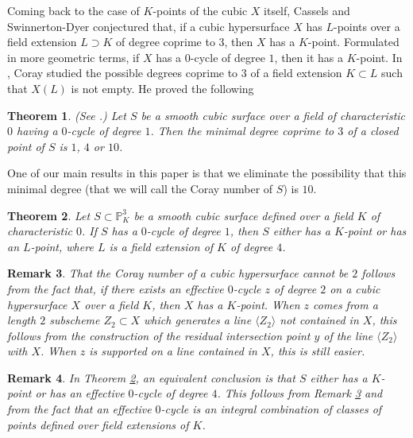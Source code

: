 \documentclass[10pt]{article}
\newtheorem{theo}{Theorem}[section]
\newtheorem{rema}[theo]{Remark}
\begin{document}
Coming back to the case of $K$-points of the cubic $X$ itself, Cassels and Swinnerton-Dyer conjectured that, if a cubic hypersurface $X$ has $L$-points over a field extension $ L\supset K$ of degree coprime to $3$, then $X$ has a $K$-point. Formulated in more geometric terms, if $X$ has a $0$-cycle of degree $1$, then it has a $K$-point. In \cite{coray}, Coray studied the possible  degrees coprime to $3$ of a field extension $K\subset L$ such that $X(L)$ is not empty. He proved the following
\begin{theo}(See  \cite[Theorem 7.1]{coray}\label{theocoray}.)  Let $S$ be a  smooth cubic surface over a field of characteristic $0$ having a $0$-cycle of degree $1$. Then the minimal degree coprime to $3$ of a  closed point of $S$ is  $1$, $4$ or $10$. \end{theo}

One of our main results in this paper is that we eliminate the possibility that this minimal degree  (that we will call the Coray number of $S$) is $10$.




\begin{theo} \label{theocubicsurf}  Let $S\subset \mathbb{P}^3_K$ be a smooth cubic surface defined over a field $K$ of characteristic $0$. If $S$ has a $0$-cycle of degree $1$, then $S$ either has a $K$-point or has an $L$-point, where $L$ is a field extension of $K$ of degree $4$.
\end{theo}
\begin{rema}\label{remaprevious} {\rm   That the Coray number of a cubic hypersurface cannot be $2$ follows from the fact that, if there exists an effective $0$-cycle $z$ of degree $2$ on a cubic hypersurface $X$ over a field $K$, then $X$ has a $K$-point. When $z$ comes from a length $2$ subscheme $Z_2\subset X$ which generates a line $\langle Z_2\rangle$ not contained in $X$, this follows from the construction of the residual intersection point $y$ of the line $\langle Z_2\rangle$ with $X$. When $z$ is supported on a line  contained in $X$, this is still easier.}
\end{rema}
\begin{rema} {\rm In Theorem \ref{theocubicsurf}, an equivalent conclusion is that  $S$ either has a $K$-point or has an effective $0$-cycle of degree $4$. This follows from Remark \ref{remaprevious} and from the fact that an effective $0$-cycle is an integral combination  of classes of points defined over field extensions of $K$.}
\end{rema}
\end{document}
